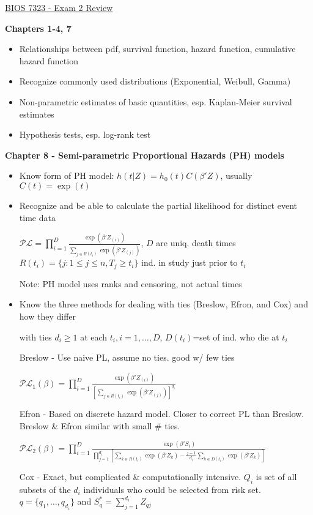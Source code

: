 \documentclass[11pt]{article}
\begin{document}
\underline{BIOS 7323 - Exam 2 Review}

\textbf{Chapters 1-4, 7}
\begin{itemize}
	\item Relationships between pdf, survival function, hazard function, cumulative hazard function
	\item Recognize commonly used distributions (Exponential, Weibull, Gamma)
	\item Non-parametric estimates of basic quantities, esp. Kaplan-Meier survival estimates
	\item Hypothesis tests, esp. log-rank test
\end{itemize}

\textbf{Chapter 8 - Semi-parametric Proportional Hazards (PH) models}
\begin{itemize}
	\item Know form of PH model:	$h(t|Z)=h_0(t)C(\beta'Z)$, usually $C(t)=\exp(t)$
	\item Recognize and be able to calculate the partial likelihood for distinct event time data
	
	$\mathcal{PL}=\prod_{i=1}^{D}\frac{\exp(\beta'Z_{(i)})}{\sum_{j\in R(t_i)} \exp(\beta'Z_{(j)})}$, $D$ are uniq. death times\\
	$R(t_i)=\{j:1\le j \le n,T_j \ge t_i\}$ ind. in study just prior to $t_i$
	
	Note: PH model uses ranks and censoring, not actual times
	
	\item Know the three methods for dealing with ties (Breslow, Efron, and Cox) and how they differ
	
	with ties $d_i\ge 1$ at each $t_i, i=1,\ldots,D$, $D(t_i)$=set of ind. who die at $t_i$
	
	Breslow - Use naive PL, assume no ties. good w/ few ties
	
	$\mathcal{PL}_1(\beta)=
	\prod_{i=1}^{D}\frac{\exp(\beta'Z_{(i)})}{[\sum_{j\in R(t_i)} \exp(\beta'Z_{(j)})]^{d_i}}$
	
	Efron - Based on discrete hazard model. Closer to correct PL than Breslow. Breslow \& Efron similar with small \# ties.
	
	$\mathcal{PL}_2(\beta)=
	\prod_{i=1}^{D}\frac{\exp(\beta'S_{i})}{
		\prod_{j=1}^{d_i}[\sum_{k\in R(t_i)} \exp(\beta'Z_{k}) - \frac{j-1}{d_i} \sum_{k\in D(t_i)} \exp(\beta'Z_{k}) ]} $
	
	Cox - Exact, but complicated \& computationally intensive. $Q_i$ is set of all subsets of the $d_i$ individuals who could be selected from risk set. $q=\{q_1,\ldots,q_{d_i}\}$ and $S_q^*=\sum_{j=1}^{d_i}Z_{qj}$
	

\end{itemize}
\end{document}
